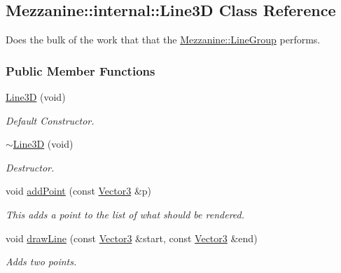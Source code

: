 \hypertarget{classMezzanine_1_1internal_1_1Line3D}{
\subsection{Mezzanine::internal::Line3D Class Reference}
\label{classMezzanine_1_1internal_1_1Line3D}
}


Does the bulk of the work that that the \hyperlink{classMezzanine_1_1LineGroup}{Mezzanine::LineGroup} performs.  


\subsubsection*{Public Member Functions}
\begin{DoxyCompactItemize}
\item 
\hyperlink{classMezzanine_1_1internal_1_1Line3D_a9b5b0aa76e55b8aa3030fe9833b81cc0}{Line3D} (void)
\begin{DoxyCompactList}\small\item\em Default Constructor. \item\end{DoxyCompactList}\item 
\hyperlink{classMezzanine_1_1internal_1_1Line3D_a3a0edfa3660255f7d00762e704f73ea7}{$\sim$Line3D} (void)
\begin{DoxyCompactList}\small\item\em Destructor. \item\end{DoxyCompactList}\item 
void \hyperlink{classMezzanine_1_1internal_1_1Line3D_a6424bf33cfa273625e1c150905fb1afd}{addPoint} (const \hyperlink{classMezzanine_1_1Vector3}{Vector3} \&p)
\begin{DoxyCompactList}\small\item\em This adds a point to the list of what should be rendered. \item\end{DoxyCompactList}\item 
void \hyperlink{classMezzanine_1_1internal_1_1Line3D_a17264ad5672bef8807ce6b4a8366e573}{drawLine} (const \hyperlink{classMezzanine_1_1Vector3}{Vector3} \&start, const \hyperlink{classMezzanine_1_1Vector3}{Vector3} \&end)
\begin{DoxyCompactList}\small\item\em Adds two points. \item\end{DoxyCompactList}\item 

\end{DoxyCompactItemize}
